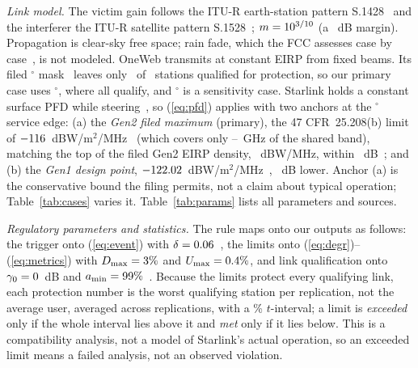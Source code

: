 \documentclass[conference]{IEEEtran}
\begin{document}
\emph{Link model.} The victim gain follows the ITU-R earth-station pattern
S.1428~\cite{itu1428} and the interferer the ITU-R satellite pattern
S.1528~\cite{itu1528}; $m = 10^{3/10}$ (a \ImplMarginDb~dB margin).
Propagation is clear-sky free space; rain fade, which the FCC assesses case by
case~\cite{fcc24117}, is not modeled. OneWeb transmits at constant EIRP from
fixed beams. Its filed \OnewebMinElevSensDeg$^\circ$
mask~\cite[Sec.~2.2]{delportillo2019} leaves only \MinElevQualStations\ of \NStations\
stations qualified for protection, so our primary case uses \StationMinElevDeg$^\circ$, where all
qualify, and \OnewebMinElevSensDeg$^\circ$ is a sensitivity case. Starlink holds a constant surface PFD while steering~\cite{fcc2291},
so (\ref{eq:pfd}) applies with two anchors at the \PfdAnchorElevDeg$^\circ$
service edge: (a) the \emph{Gen2 filed maximum} (primary), the 47 CFR~25.208(b)
limit of $-116$~dBW/m$^2$/MHz~\cite{cfr25208} (which covers only
\PfdScopeLoGhz--\PfdScopeHiGhz~GHz of the shared band), matching the top of the filed
Gen2 EIRP density, \StarlinkFiledTopDbw~dBW/MHz, within
\FiledPfdOffsetDb~dB~\cite{fcc2291}; and (b) the \emph{Gen1
design point}, $-122.02$~dBW/m$^2$/MHz~\cite[Table~A.7-1]{spacex2016},
\PfdOffsetGenOneDb~dB lower. Anchor (a) is the conservative bound the filing
permits, not a claim about typical operation; Table~\ref{tab:cases} varies it.
Table~\ref{tab:params} lists all parameters and sources.

\emph{Regulatory parameters and statistics.} The rule maps onto our outputs as
follows: the trigger onto (\ref{eq:event}) with $\delta = 0.06$~\cite{cfr25261},
the limits onto (\ref{eq:degr})--(\ref{eq:metrics}) with $D_{\max} =
3\%$ and $U_{\max} = 0.4\%$, and link qualification onto
$\gamma_0 = 0$~dB and $a_{\min} = 99\%$~\cite{fcc24117}. Because the limits
protect every qualifying link, each protection number is the worst qualifying
station per replication, not the average user, averaged across replications, with
a \CiPct\% $t$-interval; a limit is \emph{exceeded} only if the whole interval lies
above it and \emph{met} only if it lies below. This is a compatibility analysis, not a
model of Starlink's actual operation, so an exceeded limit means a failed
analysis, not an observed violation.
\end{document}

